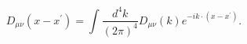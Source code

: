 \begin{equation}
D_{\mu \nu }(x-x^{\prime })=\int \frac{d^{4}k}{(2\pi )^{4}}D_{\mu \nu
}(k)e^{-ik\cdot (x-x^{\prime })}.
\end{equation}


